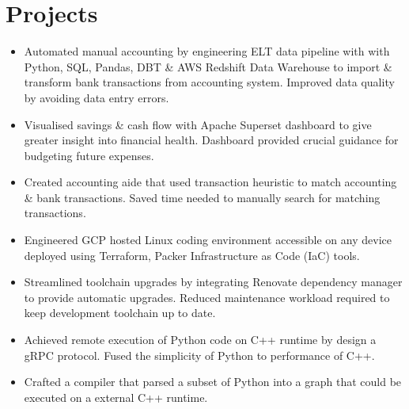\section{Projects}
\begin{itemize}
  \item Automated manual accounting by engineering ELT data pipeline with with Python, SQL, Pandas, DBT \& AWS Redshift Data Warehouse to import \& transform bank transactions from accounting system. Improved data quality by avoiding data entry errors.
  \item Visualised savings \& cash flow with Apache Superset dashboard to give greater insight into financial health. Dashboard provided crucial guidance for budgeting future expenses.
  \item Created accounting aide that used transaction heuristic to match accounting \& bank transactions. Saved time needed to manually search for matching transactions.
\end{itemize}
\begin{itemize}
  \item Engineered GCP hosted Linux coding environment accessible on any device deployed using Terraform,
    Packer Infrastructure as Code (IaC) tools.
  \item Streamlined toolchain upgrades by integrating Renovate dependency manager to provide automatic upgrades. Reduced maintenance workload required to keep development toolchain up to date.
\end{itemize}
\begin{itemize}
\item Achieved remote execution of Python code on C++ runtime by design a gRPC protocol. Fused the simplicity of Python to performance of C++.
\item Crafted a compiler that parsed a subset of Python into a graph that could be executed on a external C++ runtime.
\end{itemize}

